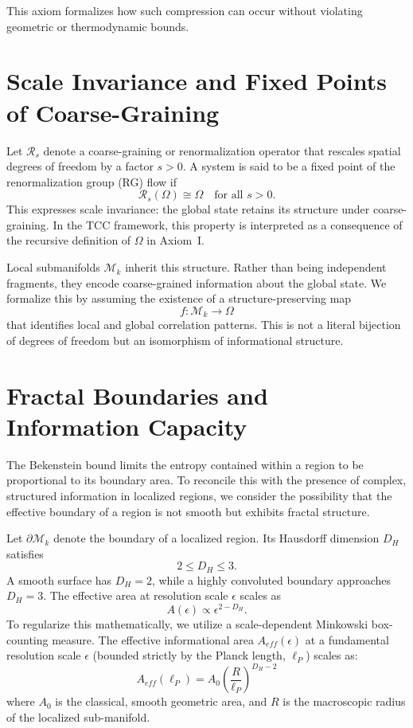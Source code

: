 \documentclass[12pt,openany]{book}
\theoremstyle{plain}
\theoremstyle{definition}
\theoremstyle{remark}
\begin{document}
This axiom formalizes how such compression can occur without violating
geometric or thermodynamic bounds.

\section{Scale Invariance and Fixed Points of Coarse-Graining}
Let $\mathcal{R}_{s}$ denote a coarse-graining or renormalization operator that
rescales spatial degrees of freedom by a factor $s>0$. A system is said to be a
fixed point of the renormalization group (RG) flow if
\[
\mathcal{R}_{s}(\Omega) \cong \Omega
\quad \text{for all } s>0.
\]
This expresses scale invariance: the global state retains its structure under
coarse-graining. In the TCC framework, this property is interpreted as a
consequence of the recursive definition of $\Omega$ in Axiom~I.

Local submanifolds $\mathcal{M}_{k}$ inherit this structure. Rather than being
independent fragments, they encode coarse-grained information about the global
state. We formalize this by assuming the existence of a structure-preserving
map
\[
f : \mathcal{M}_{k} \to \Omega
\]
that identifies local and global correlation patterns. This is not a literal
bijection of degrees of freedom but an isomorphism of informational structure.

\section{Fractal Boundaries and Information Capacity}
The Bekenstein bound limits the entropy contained within a region to be
proportional to its boundary area. To reconcile this with the presence of
complex, structured information in localized regions, we consider the
possibility that the effective boundary of a region is not smooth but exhibits
fractal structure.

Let $\partial \mathcal{M}_{k}$ denote the boundary of a localized region. Its
Hausdorff dimension $D_{H}$ satisfies
\[
2 \le D_{H} \le 3.
\]
A smooth surface has $D_{H}=2$, while a highly convoluted boundary approaches
$D_{H}=3$. The effective area at resolution scale $\epsilon$ scales as
\[
A(\epsilon) \propto \epsilon^{2-D_{H}}.
\]
To regularize this mathematically, we utilize a scale-dependent Minkowski box-counting measure. The effective informational area $A_{eff}(\epsilon)$ at a fundamental resolution scale $\epsilon$ (bounded strictly by the Planck length, $\ell_P$) scales as:
\begin{equation}
A_{eff}(\ell_P) = A_0 \left( \frac{R}{\ell_P} \right)^{D_H - 2}
\end{equation}
where $A_0$ is the classical, smooth geometric area, and $R$ is the macroscopic radius of the localized sub-manifold.
\end{document}
